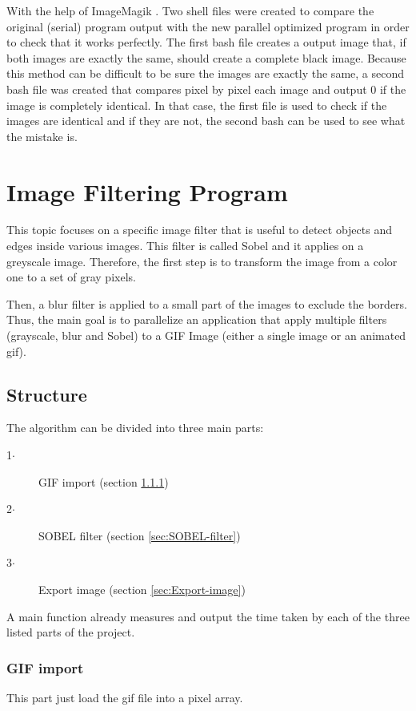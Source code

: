 \documentclass[conference,compsoc]{IEEEtran}
\begin{document}
With the help of ImageMagik \cite{IMAGEMAGICK}. Two shell files were created to compare the original (serial) program output with the new parallel optimized program in order to check that it works perfectly. The first bash file creates a output image that, if both images are exactly the same, should create a complete black image. Because this method can be difficult to be sure the images are exactly the same, a second bash file was created that compares pixel by pixel each image and output 0 if the image is completely identical. In that case, the first file is used to check if the images are identical and if they are not, the second bash can be used to see what the mistake is.

\section{Image Filtering Program}
This topic focuses on a specific image filter that is useful to detect objects and edges inside various images. This filter is called Sobel and it applies on a greyscale image. Therefore, the first step is to transform the image from a color one to a set of gray pixels. 

Then, a blur filter is applied to a small part of the images to exclude the borders. Thus, the main goal is to parallelize an application that apply multiple filters (grayscale, blur and Sobel) to a GIF Image (either a single image or an animated gif). \cite{CoursePage}
\subsection{Structure}
The algorithm can be divided into three main parts:
\begin{description}
	\item[1$\cdot$] GIF import (section \ref{sec:GIF-import})
	\item[2$\cdot$] SOBEL filter (section \ref{sec:SOBEL-filter})
	\item[3$\cdot$] Export image (section \ref{sec:Export-image})
\end{description}
A main function already measures and output the time taken by each of the three listed parts of the project.

\subsubsection{GIF import}\label{sec:GIF-import}
This part just load the gif file into a pixel array. 
\end{document}
